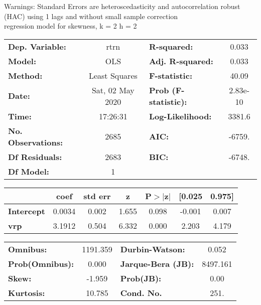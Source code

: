 Warnings: \newline
 [1] Standard Errors are heteroscedasticity and autocorrelation robust (HAC) using 1 lags and without small sample correction\\ 

regression model for skewness, k = 2 h = 2\begin{center}
\begin{tabular}{lclc}
\toprule
\textbf{Dep. Variable:}    &       rtrn       & \textbf{  R-squared:         } &     0.033   \\
\textbf{Model:}            &       OLS        & \textbf{  Adj. R-squared:    } &     0.033   \\
\textbf{Method:}           &  Least Squares   & \textbf{  F-statistic:       } &     40.09   \\
\textbf{Date:}             & Sat, 02 May 2020 & \textbf{  Prob (F-statistic):} &  2.83e-10   \\
\textbf{Time:}             &     17:26:31     & \textbf{  Log-Likelihood:    } &    3381.6   \\
\textbf{No. Observations:} &        2685      & \textbf{  AIC:               } &    -6759.   \\
\textbf{Df Residuals:}     &        2683      & \textbf{  BIC:               } &    -6748.   \\
\textbf{Df Model:}         &           1      & \textbf{                     } &             \\
\bottomrule
\end{tabular}
\begin{tabular}{lcccccc}
                   & \textbf{coef} & \textbf{std err} & \textbf{z} & \textbf{P$> |$z$|$} & \textbf{[0.025} & \textbf{0.975]}  \\
\midrule
\textbf{Intercept} &       0.0034  &        0.002     &     1.655  &         0.098        &       -0.001    &        0.007     \\
\textbf{vrp}       &       3.1912  &        0.504     &     6.332  &         0.000        &        2.203    &        4.179     \\
\bottomrule
\end{tabular}
\begin{tabular}{lclc}
\textbf{Omnibus:}       & 1191.359 & \textbf{  Durbin-Watson:     } &    0.052  \\
\textbf{Prob(Omnibus):} &   0.000  & \textbf{  Jarque-Bera (JB):  } & 8497.161  \\
\textbf{Skew:}          &  -1.959  & \textbf{  Prob(JB):          } &     0.00  \\
\textbf{Kurtosis:}      &  10.785  & \textbf{  Cond. No.          } &     251.  \\
\bottomrule
\end{tabular}
\end{center}

